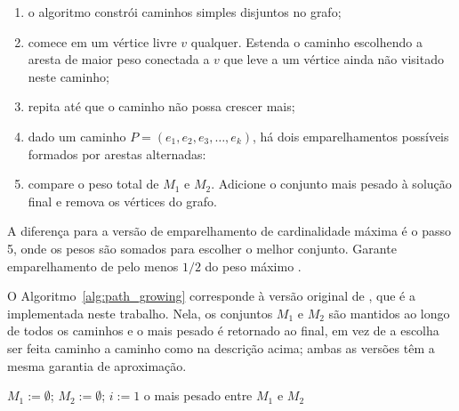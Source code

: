 \begin{enumerate}
    \item o algoritmo constrói caminhos simples disjuntos no grafo;
    \item comece em um vértice livre $v$ qualquer. Estenda o caminho escolhendo a aresta de maior peso conectada a $v$ que leve a um vértice ainda não visitado neste caminho;
    \item repita até que o caminho não possa crescer mais;
    \item dado um caminho $P = (e_1, e_2, e_3, \dots, e_k)$, há dois emparelhamentos possíveis formados por arestas alternadas:
    \item compare o peso total de $M_1$ e $M_2$. Adicione o conjunto mais pesado à solução final e remova os vértices do grafo.
\end{enumerate}

A diferença para a versão de emparelhamento de cardinalidade máxima é o passo 5, onde os pesos são somados para escolher o melhor conjunto. Garante emparelhamento de pelo menos $1/2$ do peso máximo \cite{drake}.

O Algoritmo~\ref{alg:path_growing} corresponde à versão original de , que é a implementada neste trabalho. Nela, os conjuntos $M_1$ e $M_2$ são mantidos ao longo de todos os caminhos e o mais pesado é retornado ao final, em vez de a escolha ser feita caminho a caminho como na descrição acima; ambas as versões têm a mesma garantia de aproximação.

\begin{algorithm}[H]
    \DontPrintSemicolon
    \SetAlgoLined

    \caption{Algoritmo Path Growing \cite{drake}}
    \label{alg:path_growing}

    $M_1 := \emptyset$; $M_2 := \emptyset$; $i := 1$\label{pg:init}\;
    \KwRet o mais pesado entre $M_1$ e $M_2$\label{pg:ret}\;
\end{algorithm}

